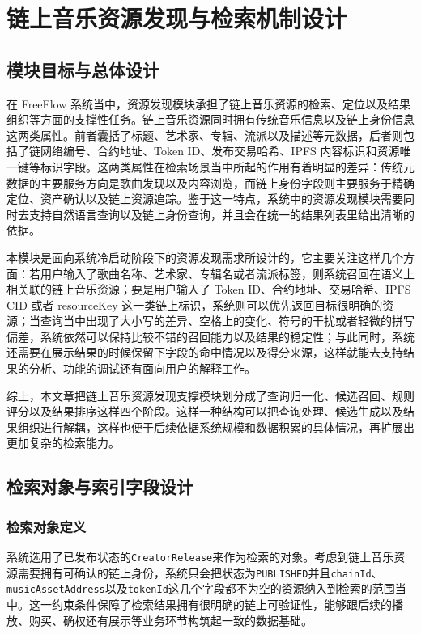 
\chapter{链上音乐资源发现与检索机制设计}


\section{模块目标与总体设计}

在 FreeFlow 系统当中，资源发现模块承担了链上音乐资源的检索、定位以及结果组织等方面的支撑性任务。链上音乐资源同时拥有传统音乐信息以及链上身份信息这两类属性。前者囊括了标题、艺术家、专辑、流派以及描述等元数据，后者则包括了链网络编号、合约地址、Token ID、发布交易哈希、IPFS 内容标识和资源唯一键等标识字段。这两类属性在检索场景当中所起的作用有着明显的差异：传统元数据的主要服务方向是歌曲发现以及内容浏览，而链上身份字段则主要服务于精确定位、资产确认以及链上资源追踪。鉴于这一特点，系统中的资源发现模块需要同时去支持自然语言查询以及链上身份查询，并且会在统一的结果列表里给出清晰的依据。

本模块是面向系统冷启动阶段下的资源发现需求所设计的，它主要关注这样几个方面：若用户输入了歌曲名称、艺术家、专辑名或者流派标签，则系统召回在语义上相关联的链上音乐资源；要是用户输入了 Token ID、合约地址、交易哈希、IPFS CID 或者 resourceKey 这一类链上标识，系统则可以优先返回目标很明确的资源；当查询当中出现了大小写的差异、空格上的变化、符号的干扰或者轻微的拼写偏差，系统依然可以保持比较不错的召回能力以及结果的稳定性；与此同时，系统还需要在展示结果的时候保留下字段的命中情况以及得分来源，这样就能去支持结果的分析、功能的调试还有面向用户的解释工作。

综上，本文章把链上音乐资源发现支撑模块划分成了查询归一化、候选召回、规则评分以及结果排序这样四个阶段。这样一种结构可以把查询处理、候选生成以及结果组织进行解耦，这样也便于后续依据系统规模和数据积累的具体情况，再扩展出更加复杂的检索能力。


\section{检索对象与索引字段设计}

\subsection{检索对象定义}

系统选用了已发布状态的\texttt{CreatorRelease}来作为检索的对象。考虑到链上音乐资源需要拥有可确认的链上身份，系统只会把状态为\texttt{PUBLISHED}并且\texttt{chainId}、\texttt{musicAssetAddress}以及\texttt{tokenId}这几个字段都不为空的资源纳入到检索的范围当中。这一约束条件保障了检索结果拥有很明确的链上可验证性，能够跟后续的播放、购买、确权还有展示等业务环节构筑起一致的数据基础。


